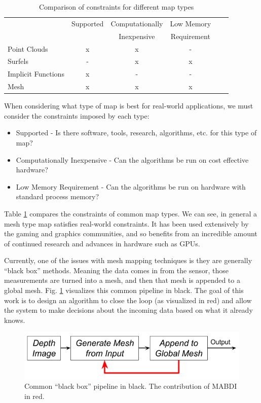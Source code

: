 \begin{table}[h]
\begin{footnotesize}
\begin{center}
\begin{tabular}{|l|c|c|c|c|c|}
\hline
\multirow{2}{*}{} & Supported & Computationally & Low Memory \\
 & & Inexpensive & Requirement \\\hline
Point Clouds		& x & x & - \\
Surfels             	& - & x & x \\
Implicit Functions 	& x & - & - \\
Mesh	 	& x & x & x \\
\hline
\end{tabular}
\end{center}
\end{footnotesize}
\caption{Comparison of constraints for different map types}
\label{tab:rep}
\end{table}

When considering what type of map is best for real-world applications, we must consider the constraints imposed by each type:

\begin{itemize}
\item Supported - Is there software, tools, research, algorithms, etc. for this type of map?
\item Computationally Inexpensive - Can the algorithms be run on cost effective hardware?
\item Low Memory Requirement - Can the algorithms be run on hardware with standard process memory?
\end{itemize}

Table \ref{tab:rep} compares the constraints of common map types. We can see, in
general a mesh type map satisfies real-world constraints. It has been used
extensively by the gaming and graphics communities, and so benefits from an
incredible amount of continued research and advances in hardware such as GPUs.

Currently, one of the issues with mesh mapping techniques is they are generally
``black box'' methods. Meaning the data comes in from the sensor, those
measurements are turned into a mesh, and then that mesh is appended to a global
mesh. Fig. \ref{fig:pipeline} visualizes this common pipeline in black. The goal
of this work is to design an algorithm to close the loop (as visualized in red)
and allow the system to make decisions about the incoming data based on what it
already knows.

\begin{figure}[h]%
\centering
\includegraphics[width=.5\textwidth]{figures/diagram_general_pipeline.png}
\caption{Common ``black box'' pipeline in black. The contribution of MABDI in red.}
\label{fig:pipeline}
\end{figure}
